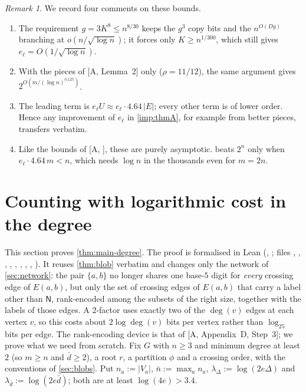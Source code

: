 \documentclass[11pt]{amsart}
\theoremstyle{plain}
\theoremstyle{definition}
\theoremstyle{remark}
\newtheorem{remark}[theorem]{Remark}
\numberwithin{equation}{section}
\newcommand{\lab}[1]{\mathsf{#1}}
\newcommand{\A}[1][]{\textup{[A\if\relax\detokenize{#1}\relax\else, #1\fi]}}
\begin{document}
\begin{remark}\label{rem:rate}
We record four comments on these bounds.
\begin{enumerate}[label=(\alph*)]
\item The requirement $g=3K^8\le n^{8/30}$ keeps the $g^3$ copy bits and the $n^{O(Dg)}$ branching
at $o(n/\sqrt{\log n})$; it forces only $K\ge n^{1/300}$, which still gives $e_\ell=
O(1/\sqrt{\log n})$.
\item With the pieces of \A[Lemma~2] only ($\rho=11/12$), the same argument gives
$2^{O(m/(\log n)^{0.125})}$.
\item The leading term is $e_\ell U\approx e_\ell\cdot4.64\,|E|$; every other term is of lower
order. Hence any improvement of $e_\ell$ in \cref{imp:thmA}, for example from better pieces,
transfers verbatim.
\item Like the bounds of \A, these are purely asymptotic.  beats $2^n$ only
when $e_\ell\cdot4.64\,m<n$, which needs $\log n$ in the thousands even for $m=2n$.
\end{enumerate}
\end{remark}

\section{Counting with logarithmic cost in the degree}\label{sec:degree}

This section proves \cref{thm:main-degree}. The proof is formalised in Lean (,
; files , , ,
, , , , ,
). It reuses \cref{thm:blob} verbatim and changes only the network of
\cref{sec:network}: the pair $\{a,b\}$ no longer shares one base-$5$ digit for \emph{every}
crossing edge of $E(a,b)$, but only the set of crossing edges of $E(a,b)$ that carry a label other
than $\lab N$, rank-encoded among the subsets of the right size, together with the labels of those
edges. A $2$-factor uses exactly two of the $\deg(v)$ edges at each vertex $v$, so this costs about
$2\log\deg(v)$ bits per vertex rather than $\log_25$ bits per edge. The rank-encoding device is
that of \A[Appendix~D, Step~3]; we prove what we need from scratch. Fix $G$ with $n\ge3$ and
minimum degree at least $2$ (so $m\ge n$ and $\bar d\ge2$), a root $r$, a partition $\phi$ and a
crossing order, with the conventions of \cref{sec:blobs}. Put $n_a:=|V_a|$, $\bar n:=\max_an_a$,
$\lambda_\Delta:=\log(2e\Delta)$ and $\lambda_{\bar d}:=\log(2e\bar d)$; both are at least
$\log(4e)>3.4$.
\end{document}
